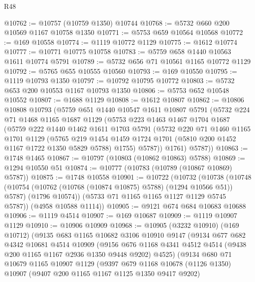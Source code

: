 \begin{lexlean}{R48}
\begin{coremodule}
@10762 := @10757 (@10759 @1350) @10744
@10768 := @5732 @660 @200 @10569 @1167 @10758 @1350
@10771 := @5753 @659 @10564 @10568
@10772 := @169 @10558
@10774 := @1119 @10772 @1129
@10775 := @1612 @10774
@10777 := @10771 @10775 @10758
@10783 := @5759 @658 @1440 @10563 @1611 @10774 @5791
@10789 := @5732 @656 @71 @10561 @1165 @10772 @1129
@10792 := @5765 @655 @10555 @10560
@10793 := @169 @10550
@10795 := @1119 @10793 @1350
@10797 := @10792 @10795 @10772
@10803 := @5732 @653 @200 @10553 @1167 @10793 @1350
@10806 := @5753 @652 @10548 @10552
@10807 := @1688 @1129
@10808 := @1612 @10807
@10862 := @10806
    @10808
    @10793
    (@5759
      @651
      @1440
      @10547
      @1611
      @10807
      @5791
      (@5732
        @224
        @71
        @1468
        @1165
        @1687
        @1129
        (@5753
          @223
          @1463
          @1467
          @1704
          @1687
          (@5759
            @222
            @1440
            @1462
            @1611
            @1703
            @5791
            (@5732
              @220
              @71
              @1460
              @1165
              @1701
              @1129
              (@5765
                @219
                @1454
                @1459
                @1724
                @1701
                (@5810 @200 @1452 @1167 @1722 @1350 @5829 @5788)
                @1755)
              @5787))
          @1761)
        @5787))
@10863 := @1748 @1465
@10867 := @10797 (@10803 (@10862 @10863) @5788)
@10869 := @1294 @10550 @51
@10874 := @10777 (@10783 (@10789 (@10867 @10869) @5787))
@10875 := @1748 @10558
@10901 := @10722
    (@10732
      (@10738
        (@10748
          (@10754 (@10762 (@10768 (@10874 @10875) @5788) (@1294 @10566 @51)) @5787)
          (@1796 @10574))
        (@5733 @71 @1165 @1165 @1127 @1129 @5745 @5787))
      (@4958 @10588 @1114))
@10905 := @9121 @674 @684 @10683 @10688
@10906 := @1119 @4514
@10907 := @169 @10687
@10909 := @1119 @10907 @1129
@10910 := @10906 @10909
@10968 := @10905
    (@3232 @10910)
    (@169 @10712)
    (@9135
      @683
      @1165
      @10682
      @3106
      @10910
      @9147
      (@9134
        @677
        @682
        @4342
        @10681
        @4514
        @10909
        (@9156 @676 @1168 @4341 @4512 @4514 (@9438 @200 @1165 @1167 @2936 @1350 @9448 @9202) @4525)
        (@9134
          @680
          @71
          @10679
          @1165
          @10907
          @1129
          (@9397
            @679
            @1168
            @10678
            (@1126 @1350)
            @10907
            (@9407 @200 @1165 @1167 @1125 @1350 @9417 @9202)

\end{coremodule}
\end{lexlean}
